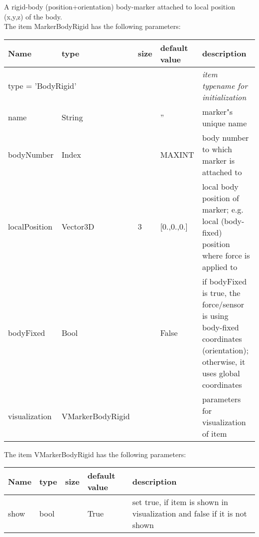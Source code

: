 A rigid-body (position+orientation) body-marker attached to local position (x,y,z) of the body.
 \\The item MarkerBodyRigid has the following parameters:
\begin{center}
  \footnotesize
  \begin{longtable}{| p{4.5cm} | p{2.5cm} | p{0.5cm} | p{2.5cm} | p{6cm} |}
    \hline
    \bf Name & \bf type & \bf size & \bf default value & \bf description \\ \hline
    \multicolumn{4}{l}{\parbox{10cm}{type = 'BodyRigid'}} & \multicolumn{1}{l}{\parbox{6cm}{\it item typename for initialization}}\\ \hline
    name &     String &      &     '' &     marker"s unique name\\ \hline
    bodyNumber &     Index &      &     MAXINT &     body number to which marker is attached to\\ \hline
    localPosition &     Vector3D &     3 &     [0.,0.,0.] &     local body position of marker; e.g. local (body-fixed) position where force is applied to\\ \hline
    bodyFixed &     Bool &      &     False &     if bodyFixed is true, the force/sensor is using body-fixed coordinates (orientation); otherwise, it uses global coordinates\\ \hline
    visualization & VMarkerBodyRigid & & & parameters for visualization of item \\ \hline
	  \end{longtable}
	\end{center}
The item VMarkerBodyRigid has the following parameters:
\begin{center}
  \footnotesize
  \begin{longtable}{| p{4.5cm} | p{2.5cm} | p{0.5cm} | p{2.5cm} | p{6cm} |}
    \hline
    \bf Name & \bf type & \bf size & \bf default value & \bf description \\ \hline
    show &     bool &      &     True &     set true, if item is shown in visualization and false if it is not shown\\ \hline
	  \end{longtable}
	\end{center}

